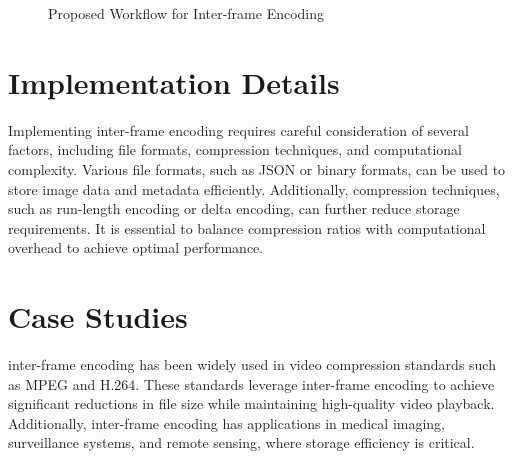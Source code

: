 \documentclass[twocolumn]{article}
\begin{document}
\begin{figure}[H]
    \centering
    \caption{Proposed Workflow for Inter-frame Encoding}
    \label{fig:figure4}
\end{figure}


\section{Implementation Details}
Implementing inter-frame encoding requires careful consideration of several factors, including file formats, compression techniques, and computational complexity. Various file formats, such as JSON or binary formats, can be used to store image data and metadata efficiently. Additionally, compression techniques, such as run-length encoding or delta encoding, can further reduce storage requirements. It is essential to balance compression ratios with computational overhead to achieve optimal performance.


\section{Case Studies}
inter-frame encoding has been widely used in video compression standards such as MPEG and H.264. These standards leverage inter-frame encoding to achieve significant reductions in file size while maintaining high-quality video playback. Additionally, inter-frame encoding has applications in medical imaging, surveillance systems, and remote sensing, where storage efficiency is critical.
\end{document}
